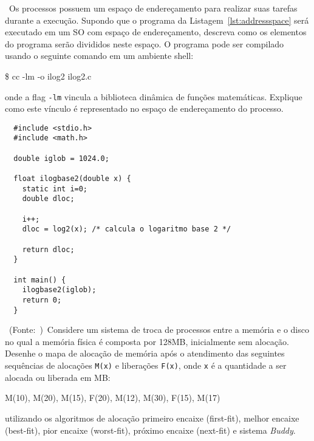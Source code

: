 \footnotesize

\exercise~Os processos possuem um espaço de endereçamento para
realizar suas tarefas durante a execução. Supondo que o programa da
Listagem~\ref{lst:addressspace} será executado em um SO com espaço de
endereçamento, descreva como os elementos do programa serão divididos
neste espaço. O programa pode ser compilado usando o seguinte comando
em um ambiente shell:

\smallskip\noindent\begin{tt}
  \$ cc -lm -o ilog2 ilog2.c
\end{tt}\smallskip

\noindent onde a flag {\tt -lm} vincula a biblioteca dinâmica de funções
matemáticas. Explique como este vínculo é representado no espaço de
endereçamento do processo.

\begin{lstlisting}
  #include <stdio.h>
  #include <math.h>

  double iglob = 1024.0;

  float ilogbase2(double x) {
    static int i=0;
    double dloc;

    i++;
    dloc = log2(x); /* calcula o logaritmo base 2 */

    return dloc;
  }

  int main() {
    ilogbase2(iglob);
    return 0;
  }
\end{lstlisting}

\exercise~(Fonte:~\cite{stuart2011})~Considere um sistema de
troca de processos entre a memória e o disco no qual a memória física
é composta por 128MB, inicialmente sem alocação. Desenhe o mapa de
alocação de memória após o atendimento das seguintes sequências de
alocações {\tt M(x)} e liberações {\tt F(x)}, onde {\tt x} é a
quantidade a ser alocada ou liberada em MB:

\begin{center}
  \begin{tt}
    M(10), M(20), M(15), F(20), M(12), M(30), F(15), M(17) 
  \end{tt}
\end{center}

\noindent utilizando os algoritmos de alocação primeiro encaixe
(first-fit), melhor encaixe (best-fit), pior encaixe (worst-fit),
próximo encaixe (next-fit) e sistema {\em Buddy}.

